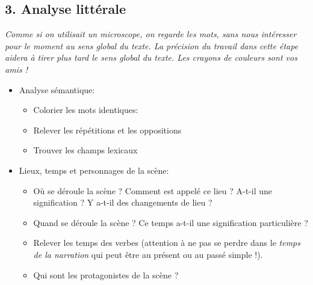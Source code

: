\subsection*{3. Analyse littérale}
\textit{Comme si on utilisait un microscope, on regarde les mots, sans nous intéresser pour le moment au sens global du texte. La précision du travail dans cette étape aidera à tirer plus tard le sens global du texte. Les crayons de couleurs sont vos amis !}
\begin{itemize}[label=]
    \item Analyse sémantique:
          \begin{itemize}[label=]
              \item Colorier les mots identiques:
              \item Relever les répétitions et les oppositions
              \item Trouver les champs lexicaux
          \end{itemize}
    \item Lieux, temps et personnages de la scène:
          \begin{itemize}[label=]
              \item Où se déroule la scène ? Comment est appelé ce lieu ? A-t-il une signification ? Y a-t-il des changements de lieu ?
              \item Quand se déroule la scène ? Ce temps a-t-il une signification particulière ?
              \item Relever les temps des verbes (attention à ne pas se perdre dans le \textit{temps de la narration} qui peut être au présent ou au passé simple !).
              \item Qui sont les protagonistes de la scène ?
          \end{itemize}
\end{itemize}
